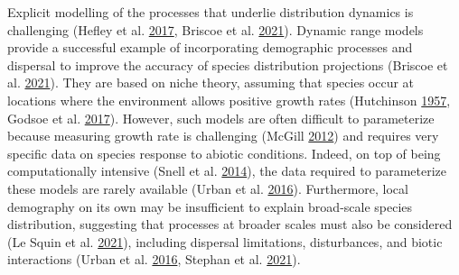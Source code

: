 \documentclass[12pt]{article}
\begin{document}
Explicit modelling of the processes that underlie distribution dynamics
is challenging (Hefley et al.
\protect\hyperlink{ref-hefley_when_2017}{2017}, Briscoe et al.
\protect\hyperlink{ref-briscoe_can_2021}{2021}). Dynamic range models
provide a successful example of incorporating demographic processes and
dispersal to improve the accuracy of species distribution projections
(Briscoe et al. \protect\hyperlink{ref-briscoe_can_2021}{2021}). They
are based on niche theory, assuming that species occur at locations
where the environment allows positive growth rates (Hutchinson
\protect\hyperlink{ref-hutchinson_concluding_1957}{1957}, Godsoe et al.
\protect\hyperlink{ref-godsoe_integrating_2017}{2017}). However, such
models are often difficult to parameterize because measuring growth rate
is challenging (McGill \protect\hyperlink{ref-mcgill_trees_2012}{2012})
and requires very specific data on species response to abiotic
conditions. Indeed, on top of being computationally intensive (Snell et
al. \protect\hyperlink{ref-snell_using_2014}{2014}), the data required
to parameterize these models are rarely available (Urban et al.
\protect\hyperlink{ref-urban_improving_2016}{2016}). Furthermore, local
demography on its own may be insufficient to explain broad-scale species
distribution, suggesting that processes at broader scales must also be
considered (Le Squin et al.
\protect\hyperlink{ref-le_squin_climateinduced_2021}{2021}), including
dispersal limitations, disturbances, and biotic interactions (Urban et
al. \protect\hyperlink{ref-urban_improving_2016}{2016}, Stephan et al.
\protect\hyperlink{ref-stephan_positive_2021}{2021}).
\end{document}
